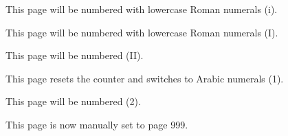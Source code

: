 \documentclass{article}
\begin{document}
This page will be numbered with lowercase Roman numerals (i).

\newpage

This page will be numbered with lowercase Roman numerals (I).

\newpage

This page will be numbered (II).

\newpage

This page resets the counter and switches to Arabic numerals (1).

\newpage

This page will be numbered (2).

\newpage

\setcounter{page}{999}
This page is now manually set to page 999.

\newpage
\end{document}
